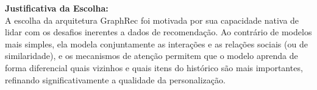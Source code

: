 \textbf{Justificativa da Escolha:} \\
A escolha da arquitetura GraphRec foi motivada por sua capacidade nativa de lidar com os desafios inerentes a dados de recomendação. Ao contrário de modelos mais simples, ela modela conjuntamente as interações e as relações sociais (ou de similaridade), e os mecanismos de atenção permitem que o modelo aprenda de forma diferencial quais vizinhos e quais itens do histórico são mais importantes, refinando significativamente a qualidade da personalização.